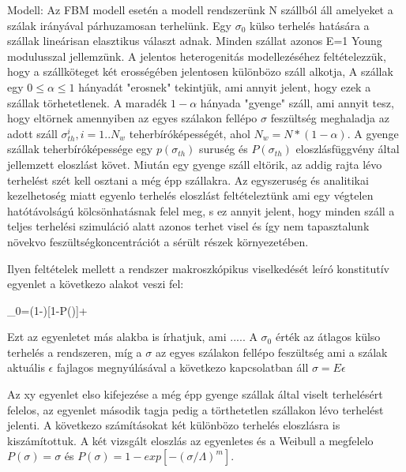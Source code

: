  Modell:
 Az FBM modell esetén a modell rendszerünk N szállból áll amelyeket a szálak irányával párhuzamosan terhelünk. Egy $\sigma_0$ külso
 terhelés hatására a szállak lineárisan elasztikus választ adnak. Minden szállat azonos E=1 Young modulusszal jellemzünk.
 A jelentos heterogenitás modellezéséhez feltételezzük, hogy a szállköteget két erosségében jelentosen különbözo
 száll alkotja, A szállak egy $0\leq\alpha\leq 1$ hányadát "erosnek" tekintjük, ami annyit jelent, hogy ezek a szállak törhetetlenek.
 A maradék $1-\alpha$ hányada "gyenge" száll, ami annyit tesz, hogy eltörnek amennyiben az egyes szálakon fellépo $\sigma$ feszültség
 meghaladja az adott száll $\sigma_{th}^i, i=1..N_w$ teherbíróképességét, ahol $N_w=N*(1-\alpha)$. A gyenge szállak teherbíróképessége
 egy $p(\sigma_{th})$ suruség és $P(\sigma_{th})$ eloszlásfüggvény által jellemzett eloszlást követ. 
 Miután egy gyenge száll eltörik, az addig rajta lévo terhelést szét kell osztani a még épp szállakra. Az egyszeruség és analitikai
 kezelhetoség miatt egyenlo terhelés eloszlást feltételeztünk ami egy végtelen hatótávolságú kölcsönhatásnak felel meg, s ez annyit jelent,
 hogy minden száll a teljes terhelési szimuláció alatt azonos terhet visel és így nem tapasztalunk növekvo feszültségkoncentrációt a
 sérült részek környezetében.
 
 Ilyen feltételek mellett a rendszer makroszkópikus viselkedését leíró konstitutív egyenlet a következo alakot veszi fel:
 
\beq
\label{equ:consti}
\sigma_0=(1-\alpha)[1-P(\sigma)]\sigma+\alpha\sigma
\eeq
 
 Ezt az egyenletet más alakba is írhatjuk, ami ..... A $\sigma_0$ érték az átlagos külso terhelés a rendszeren, míg a $\sigma$
 az egyes szálakon fellépo feszültség ami a szálak aktuális $\epsilon$  fajlagos megnyúlásával a következo kapcsolatban áll
 $\sigma=E\epsilon$
 
 Az xy egyenlet elso kifejezése a még épp gyenge szállak által viselt terhelésért felelos, az egyenlet második tagja pedig 
 a törthetetlen szállakon lévo terhelést jelenti. A következo számításokat két különbözo terhelés eloszlásra is kiszámítottuk.
 A két vizsgált eloszlás az egyenletes és a Weibull a megfelelo $P(\sigma)=\sigma$ és $P(\sigma)=1-exp[-(\sigma/\Lambda)^m]$.
 
